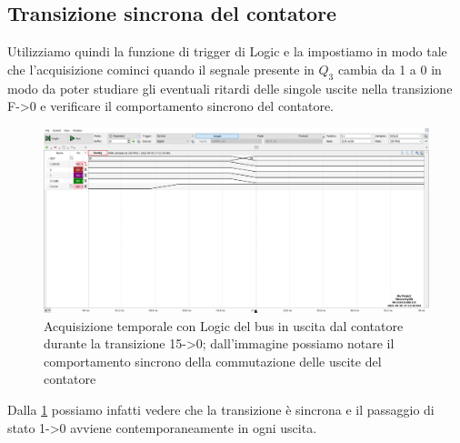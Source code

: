\documentclass[10pt, a4paper, italian]{article}
\begin{document}
\subsection{Transizione sincrona del contatore}
Utilizziamo quindi la funzione di trigger di Logic e la impostiamo in modo tale che l'acquisizione cominci quando il segnale presente in $Q_3$ cambia da 1 a 0 in modo da poter studiare gli eventuali ritardi delle singole uscite nella transizione F->0 e verificare il comportamento sincrono del contatore.
\begin{figure}[htbp]
\centering
	\includegraphics[width=\textwidth]{5.d}
	\caption{Acquisizione temporale con Logic del bus in uscita dal contatore durante la transizione 15->0; dall'immagine possiamo notare il comportamento sincrono della commutazione delle uscite del contatore \label{fig: Count_150}}
\end{figure}
Dalla \cref{fig: Count_150} possiamo infatti vedere che la transizione è sincrona e il passaggio di stato 1->0 avviene contemporaneamente in ogni uscita.
\end{document}

